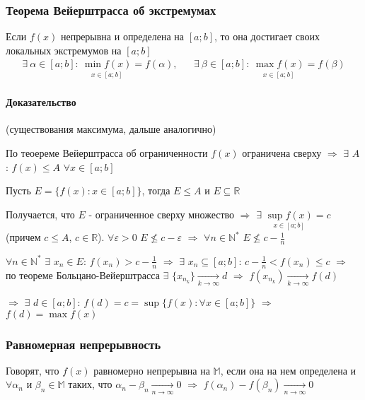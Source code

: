 \documentclass[class=article,a4paper,12pt,crop=false]{standalone}
\begin{document}
\subsubsection{Теорема Вейерштрасса об экстремумах}

Если $f(x)$ непрерывна и определена на $[a; b]$, то она достигает своих локальных экстремумов
на $[a; b]$
\begin{equation}
    \begin{aligned}
        \exists\: \alpha\in [a; b]: \:
        \underset{x \in [a; b]}{\min f(x)} = f(\alpha), & &
        \exists\: \beta \in [a; b]: \:
        \underset{x \in [a; b]}{\max f(x)} = f(\beta) 
    \end{aligned}
\end{equation}

\paragraph{Доказательство} (существования максимума, дальше аналогично)

По теоереме Вейерштрасса об ограниченности $f(x)$ ограничена сверху $\Rightarrow$
$\exists$ $A$: $f(x) \leq A$ $\forall x \in [a; b]$

Пусть $E = \{f(x): x\in [a; b]\}$, тогда $E \leq A$ и $E \subseteq \mathbb{R}$

Получается, что $E$ - ограниченное сверху множество $\Rightarrow$ $\exists$
$\underset{x \in [a; b]}{\sup f(x)} = c$ (причем $c \leq A$, $c \in \mathbb{R}$). 
$\forall \varepsilon > 0$ $E \nleq c - \varepsilon$ $\Rightarrow$
$\forall n \in \mathbb{N}^{*}$ $E \nleq c - \frac{1}{n}$

$\forall n \in \mathbb{N}^{*}$ $\exists$ $x_n \in E$: $f(x_n) > c - \frac{1}{n}$ $\Rightarrow$
$\exists$ $x_n \subseteq [a; b]$: $c - \frac{1}{n} < f(x_n) \leq c$ $\Rightarrow$ по
теореме Больцано-Вейерштрасса $\exists$ $\{x_{n_k}\} \underset{k \rightarrow \infty}{\rightarrow} d$
$\Rightarrow$
$f(x_{n_k}) \underset{k \rightarrow \infty}{\rightarrow} f(d)$

$\Rightarrow$ $\exists$ $d \in [a; b]$: $f(d) = c = \sup \{f(x): \forall x \in [a; b]\}$
$\Rightarrow$ $f(d) = \max f(x)$ 

\subsubsection{Равномерная непрерывность}

Говорят, что $f(x)$ равномерно непрерывна на $\mathbb{M}$, если она
на нем определена и $\forall \alpha_n$ и $\beta_n \in \mathbb{M}$ таких, что
$\alpha_n - \beta_n \underset{n \rightarrow \infty}{\rightarrow} 0$ $\Rightarrow$
$f(\alpha_n) - f(\beta_n) \underset{n \rightarrow \infty}{\rightarrow} 0$
\end{document}
